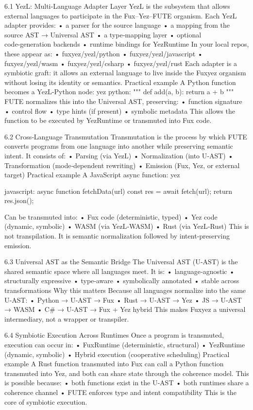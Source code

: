 6.1 YezL: Multi‑Language Adapter Layer
YezL is the subsystem that allows external languages to participate in the Fux–Yez–FUTE organism. Each YezL adapter provides:
• 	a parser for the source language
• 	a mapping from the source AST → Universal AST
• 	a type‑mapping layer
• 	optional code‑generation backends
• 	runtime bindings for YezRuntime
In your local repos, these appear as:
• 	fuxyez/yezl/python
• 	fuxyez/yezl/javascript
• 	fuxyez/yezl/wasm
• 	fuxyez/yezl/csharp
• 	fuxyez/yezl/rust
Each adapter is a symbiotic graft: it allows an external language to live inside the Fuxyez organism without losing its identity or semantics.
Practical example
A Python function becomes a YezL‑Python node:
yez {
    python: """
    def add(a, b): return a + b
    """
}
FUTE normalizes this into the Universal AST, preserving:
• 	function signature
• 	control flow
• 	type hints (if present)
• 	symbolic metadata
This allows the function to be executed by YezRuntime or transmuted into Fux code.

6.2 Cross‑Language Transmutation
Transmutation is the process by which FUTE converts programs from one language into another while preserving semantic intent. It consists of:
• 	Parsing (via YezL)
• 	Normalization (into U‑AST)
• 	Transformation (mode‑dependent rewriting)
• 	Emission (Fux, Yez, or external target)
Practical example
A JavaScript async function:
yez {
    javascript: 
    async function fetchData(url) {
        const res = await fetch(url);
        return res.json();
    }
   
}
Can be transmuted into:
• 	Fux code (deterministic, typed)
• 	Yez code (dynamic, symbolic)
• 	WASM (via YezL‑WASM)
• 	Rust (via YezL‑Rust)
This is not transpilation.
It is semantic normalization followed by intent‑preserving emission.

6.3 Universal AST as the Semantic Bridge
The Universal AST (U‑AST) is the shared semantic space where all languages meet. It is:
• 	language‑agnostic
• 	structurally expressive
• 	type‑aware
• 	symbolically annotated
• 	stable across transformations
Why this matters
Because all languages normalize into the same U‑AST:
• 	Python → U‑AST → Fux
• 	Rust → U‑AST → Yez
• 	JS → U‑AST → WASM
• 	C# → U‑AST → Fux + Yez hybrid
This makes Fuxyez a universal intermediary, not a wrapper or transpiler.

6.4 Symbiotic Execution Across Runtimes
Once a program is transmuted, execution can occur in:
• 	FuxRuntime (deterministic, structural)
• 	YezRuntime (dynamic, symbolic)
• 	Hybrid execution (cooperative scheduling)
Practical example
A Rust function transmuted into Fux can call a Python function transmuted into Yez, and both can share state through the coherence model.
This is possible because:
• 	both functions exist in the U‑AST
• 	both runtimes share a coherence channel
• 	FUTE enforces type and intent compatibility
This is the core of symbiotic execution.

